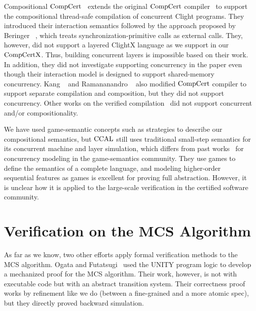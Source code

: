 Compositional $\mathrm{CompCert}$~\cite{stewart15} extends the original $\mathrm{CompCert}$ compiler~\cite{compcert}  
to support the compositional thread-safe compilation of concurrent Clight programs. 
They introduced their interaction semantics followed by the approach proposed by Beringer \etal~\cite{beringer14}, which treats
synchronization-primitive calls as external calls.
They, however, did not support a layered ClightX language as we support in our $\mathrm{CompCertX}$.  
Thus, building concurrent layers is impossible based on their work.
In addition, they did not investigate  supporting concurrency in the paper even though 
their interaction model is designed to support shared-memory concurrency.
Kang \etal~\cite{hur16} and Ramananandro \etal~\cite{ramananandro:2015} also modified $\mathrm{CompCert}$ compiler to support separate compilation and composition, 
but they did not support concurrency.  
Other works on the verified compilation~\cite{Lochbihler10esop, Sevcik11popl, zhao:2013, kang:2018} did not support concurrent and/or compositionality. 


We have used
game-semantic concepts such as strategies to describe our
compositional semantics, 
but $\mathrm{CCAL}$ still uses traditional small-step semantics for its concurrent machine and layer simulation, which differs from 
past works~\cite{ghica08,nishimura13,rideau11,abramsky99}  for concurrency modeling in the game-semantics community.
They use games to
define the semantics of a complete language, 
and modeling higher-order sequential features as games is excellent for proving full abstraction. 
However, it is unclear how it is applied to the large-scale verification in the certified software community.


\section{Verification on the MCS Algorithm}
\label{chatper:related:sec:verification-on-the-mcs-algorithm}

As far as we know, two other efforts apply formal verification methods
to the MCS algorithm.  Ogata and Futatsugi~\cite{ogata:mcs-lock} used the UNITY program logic to develop a mechanized proof for the MCS algorithm.
Their work, however, is not with executable code but with an abstract transition system. Their correctness proof works by refinement like we do (between a fine-grained and a more atomic spec), but they directly proved backward simulation.

